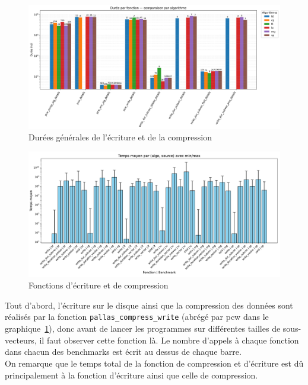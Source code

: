 \begin{figure}[!h]
    \centering
    \includegraphics[width=1\textwidth]{img/pcw_global.png}
    \caption{Durées générales de l'écriture et de la compression}
    \label{fig:pcw_global}
\end{figure}
\begin{figure}[!h]
    \centering
    \includegraphics[width=1\textwidth]{img/nas_comp_write.pdf}
    \caption{Fonctions d'écriture et de compression}
    \label{fig:cw_global}
\end{figure}
Tout d'abord, l'écriture sur le disque ainsi que la compression des données sont réalisés par la fonction \verb!pallas_compress_write! (abrégé par pcw dans le graphique~\ref{fig:pcw_global}),
donc avant de lancer les programmes sur différentes tailles de sous-vecteurs, il faut observer cette fonction là.
Le nombre d'appels à chaque fonction dans chacun des benchmarks est écrit au dessus de chaque barre.\\
On remarque que le temps total de la fonction de compression et d'écriture est dû principalement à la fonction d'écriture ainsi que celle de compression.

